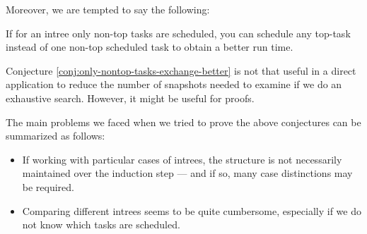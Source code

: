 Moreover, we are tempted to say the following:

\begin{conjecture}
  \label{conj:only-nontop-tasks-exchange-better}
  If for an intree only non-top tasks are scheduled, you can schedule any top-task instead of one non-top scheduled task to obtain a better run time.
\end{conjecture}

Conjecture \ref{conj:only-nontop-tasks-exchange-better} is not that useful in a direct application to reduce the number of snapshots needed to examine if we do an exhaustive search. However, it might be useful for proofs.

The main problems we faced when we tried to prove the above conjectures can be summarized as follows:
\begin{itemize}
\item If working with particular cases of intrees, the structure is not necessarily maintained over the induction step --- and if so, many case distinctions may be required.
\item Comparing different intrees seems to be quite cumbersome, especially if we do not know which tasks are scheduled.
\end{itemize}


